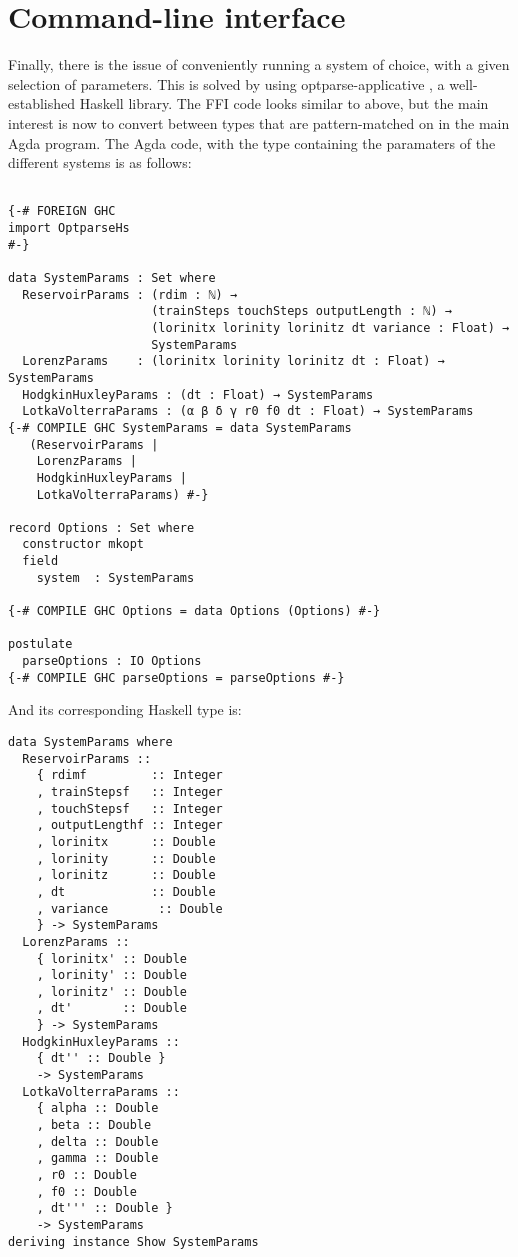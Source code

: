 \section{Command-line interface}
Finally, there is the issue of conveniently running a system of choice, with a given selection of parameters. This is solved by using optparse-applicative \cite{optparse-applicative}, a well-established Haskell library. The FFI code looks similar to above, but the main interest is now to convert between types that are pattern-matched on in the main Agda program. The Agda code, with the type containing the paramaters of the different systems is as follows:
\begin{verbatim}

{-# FOREIGN GHC 
import OptparseHs
#-}

data SystemParams : Set where
  ReservoirParams : (rdim : ℕ) → 
                    (trainSteps touchSteps outputLength : ℕ) → 
                    (lorinitx lorinity lorinitz dt variance : Float) → 
                    SystemParams
  LorenzParams    : (lorinitx lorinity lorinitz dt : Float) → SystemParams
  HodgkinHuxleyParams : (dt : Float) → SystemParams
  LotkaVolterraParams : (α β δ γ r0 f0 dt : Float) → SystemParams
{-# COMPILE GHC SystemParams = data SystemParams
   (ReservoirParams | 
    LorenzParams | 
    HodgkinHuxleyParams | 
    LotkaVolterraParams) #-}

record Options : Set where
  constructor mkopt
  field
    system  : SystemParams

{-# COMPILE GHC Options = data Options (Options) #-}

postulate 
  parseOptions : IO Options
{-# COMPILE GHC parseOptions = parseOptions #-} 
\end{verbatim}

And its corresponding Haskell type is:

\begin{verbatim}
data SystemParams where
  ReservoirParams :: 
    { rdimf         :: Integer
    , trainStepsf   :: Integer
    , touchStepsf   :: Integer
    , outputLengthf :: Integer
    , lorinitx      :: Double
    , lorinity      :: Double
    , lorinitz      :: Double
    , dt            :: Double
    , variance       :: Double
    } -> SystemParams
  LorenzParams ::
    { lorinitx' :: Double
    , lorinity' :: Double
    , lorinitz' :: Double
    , dt'       :: Double
    } -> SystemParams
  HodgkinHuxleyParams ::
    { dt'' :: Double }
    -> SystemParams
  LotkaVolterraParams ::
    { alpha :: Double
    , beta :: Double
    , delta :: Double
    , gamma :: Double
    , r0 :: Double
    , f0 :: Double
    , dt''' :: Double }
    -> SystemParams
deriving instance Show SystemParams
\end{verbatim}

